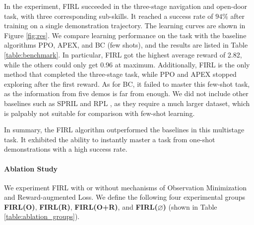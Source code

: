 \documentclass[conference]{IEEEtran}
\begin{document}
\begin{table*}
    \caption{Comparison of FIRL and related methods. \label{table:benchmark}}
    
    \begin{center}
    
    \end{center}
\end{table*}
In the experiment, FIRL succeeded in the three-stage navigation and open-door task, with three corresponding sub-skills. It reached a success rate of $94\%$ after training on a single demonstration trajectory. The learning curves are shown in Figure \ref{fig:res}.
We compare learning performance on the task with the baseline algorithms PPO, APEX, and BC (few shots), and the results are listed in Table \ref{table:benchmark}. In particular, FIRL got the highest average reward of 2.82, while the others could only get 0.96 at maximum. Additionally, FIRL is the only method that completed the three-stage task, while PPO and APEX stopped exploring after the first reward. As for BC, it failed to master this few-shot task, as the information from five demos is far from enough. We did not include other baselines such as SPRIL \cite{pertsch2020accelerating} and RPL \cite{gupta2019relay}, as they require a much larger dataset, which is palpably not suitable for comparison with few-shot learning.

In summary, the FIRL algorithm outperformed the baselines in this multistage task. It exhibited the ability to instantly master a task from one-shot demonstrations with a high success rate. 

\paragraph{Ablation Study}
We experiment FIRL with or without mechanisms of Observation Minimization and Reward-augmented Loss. We define the following four experimental groups \textbf{FIRL(O)}, \textbf{FIRL(R)}, \textbf{FIRL(O+R)}, and \textbf{FIRL(\(\varnothing\))} (shown in Table \ref{table:ablation_groups}). 
\end{document}
